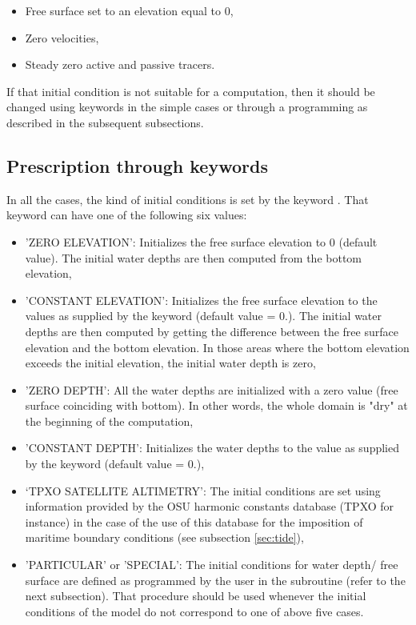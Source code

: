 \begin{itemize}
\item Free surface set to an elevation equal to 0,

\item Zero velocities,

\item Steady zero active and passive tracers.
\end{itemize}

If that initial condition is not suitable for a computation, then it should be
changed using keywords in the simple cases or through a programming as
described in the subsequent subsections.


\subsection{Prescription through keywords}

In all the cases, the kind of initial conditions is set by the keyword
. That keyword can have one of the following six
values:

\begin{itemize}
\item 'ZERO ELEVATION': Initializes the free surface elevation
to 0 (default value). The initial water depths are then computed from the
bottom elevation,

\item 'CONSTANT ELEVATION': Initializes the free surface elevation to the
values as supplied by the keyword 
(default value = 0.). The initial water
depths are then computed by getting the difference between the free surface
elevation and the bottom elevation.
In those areas where the bottom elevation exceeds
the initial elevation, the initial water depth is zero,

\item 'ZERO DEPTH': All the water depths are initialized with a zero value
(free surface coinciding with bottom). In other words, the whole domain is
"dry" at the beginning of the computation,

\item 'CONSTANT DEPTH': Initializes the water depths to the value as supplied
by the keyword  (default value = 0.),

\item `TPXO SATELLITE ALTIMETRY': The initial conditions are set using
information provided by the OSU harmonic constants database (TPXO for instance)
in the case of the use of this database for the imposition of maritime boundary
conditions (see subsection \ref{sec:tide}),

\item 'PARTICULAR' or 'SPECIAL': The initial conditions for water depth/
free surface are defined as programmed by the user
in the  subroutine (refer to the next
subsection).
That procedure should be used whenever the initial conditions of the model do
not correspond to one of above five cases.
\end{itemize}


